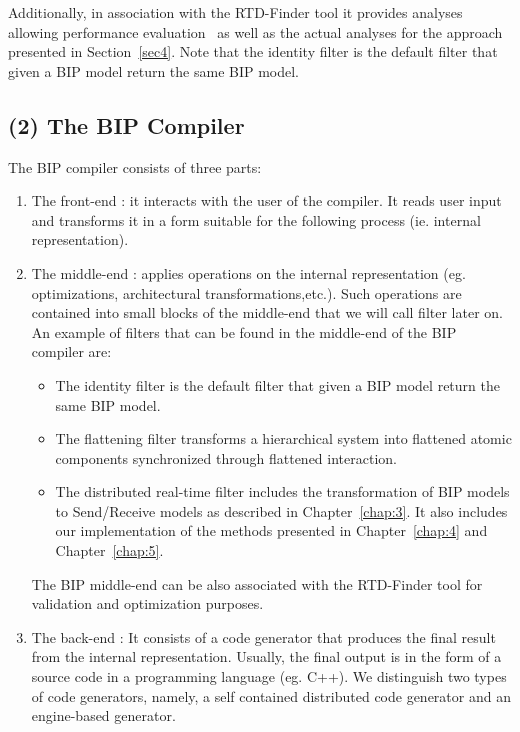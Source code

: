      Additionally, in association with the RTD-Finder tool 
    it provides analyses allowing performance evaluation~\cite{apsec17} as well as the actual
    analyses for the approach presented in Section~\ref{sec4}.
    Note that the identity filter is the default filter that given a BIP model return the same
    BIP model.

\subsection*{(2) The BIP Compiler}
The BIP compiler consists of three parts:
\begin{enumerate}
  \item The front-end : it interacts with the user of the compiler. It reads user input and 
    transforms it in a form suitable for the following process (ie. internal representation).
  \item The middle-end : applies operations on the internal representation 
    (eg. optimizations, architectural transformations,etc.). Such operations are contained 
    into small blocks of the middle-end that we will call filter later on. 
    An example of filters that can be found in the middle-end of the BIP compiler are:
    \begin{itemize}
      \item The identity filter is the default filter that given a BIP model return the
        same BIP model.
      \item The flattening filter transforms a hierarchical system into flattened 
        atomic components synchronized through flattened interaction.
      \item The distributed real-time filter includes the transformation of BIP models
        to Send/Receive models as described in Chapter~\ref{chap:3}. It also includes
        our implementation of the methods presented in Chapter~\ref{chap:4} and
        Chapter~\ref{chap:5}.
    \end{itemize}
    The BIP middle-end can be also associated with the RTD-Finder tool for validation
    and optimization purposes. 
  \item The back-end : It consists of a code generator that produces the final result from the 
    internal representation. Usually, the final output is in the form of a source code in a 
    programming language (eg. C++). We distinguish two types of code generators, namely,
    a self contained distributed code generator and an engine-based generator. 
\end{enumerate}

